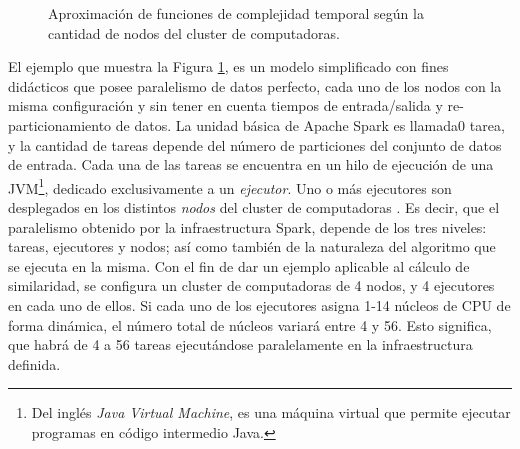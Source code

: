 \begin{figure}
	\centering
	\caption{Aproximación de funciones de complejidad temporal según la cantidad de nodos del cluster de computadoras.}
	\label{fig:complejidad_temporal_figura}
\end{figure}

\bigskip El ejemplo que muestra la Figura \ref{fig:complejidad_temporal_figura}, es un modelo simplificado con fines didácticos que posee paralelismo de datos perfecto, cada uno de los nodos con la misma configuración y sin tener en cuenta tiempos de entrada/salida y re-particionamiento de datos. La unidad básica de Apache Spark es llamada0 tarea, y la cantidad de tareas depende del número de particiones del conjunto de datos de entrada. Cada una de las tareas se encuentra en un hilo de ejecución de una JVM\footnote{Del inglés \textit{Java Virtual Machine}, es una máquina virtual que permite ejecutar programas en código intermedio Java.}, dedicado exclusivamente a un \textit{ejecutor}. Uno o más ejecutores son desplegados en los distintos \textit{nodos} del cluster de computadoras \citep{janardhanan2020optimum}. Es decir, que el paralelismo obtenido por la infraestructura Spark, depende de los tres niveles: tareas, ejecutores y nodos; así como también de la naturaleza del algoritmo que se ejecuta en la misma. Con el fin de dar un ejemplo aplicable al cálculo de similaridad, se configura un cluster de computadoras de 4 nodos, y 4 ejecutores en cada uno de ellos. Si cada uno de los ejecutores asigna 1-14 núcleos de CPU de forma dinámica, el número total de núcleos variará entre 4 y 56. Esto significa, que habrá de 4 a 56 tareas ejecutándose paralelamente en la infraestructura definida.
